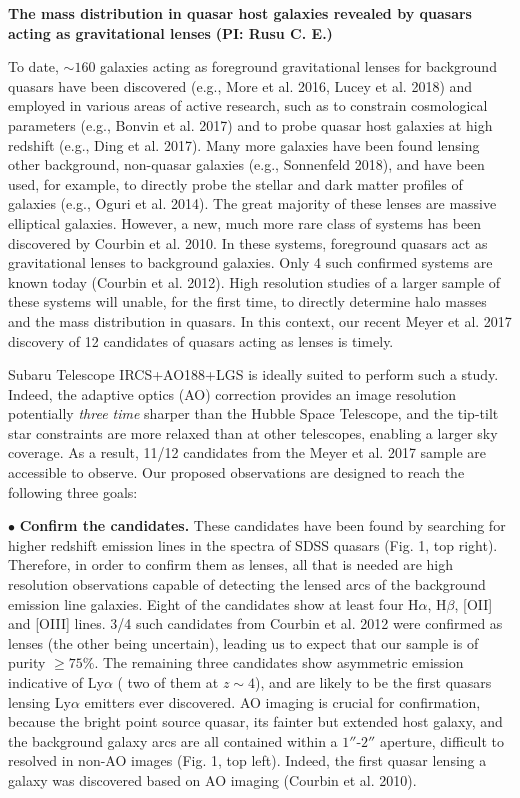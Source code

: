 \documentclass[a4paper,11pt]{article}
\begin{document}
\begin {centering}
{\bf The mass distribution in quasar host galaxies revealed by quasars acting as gravitational lenses} {\bf (PI: Rusu C. E.)}\\
 \end{centering}
 
\medskip

To date, $\sim160$ galaxies acting as foreground gravitational lenses for background quasars have been discovered (e.g., More et al. 2016, Lucey et al. 2018) and employed in various areas of active research, such as to constrain cosmological parameters (e.g., Bonvin et al. 2017) and to probe quasar host galaxies at high redshift (e.g., Ding et al. 2017). Many more galaxies have been found lensing other background, non-quasar galaxies (e.g., Sonnenfeld 2018), and have been used, for example, to directly probe the stellar and dark matter profiles of galaxies (e.g., Oguri et al. 2014). The great majority of these lenses are massive elliptical galaxies. However, a new, much more rare class of systems has been discovered by Courbin et al. 2010. In these systems, foreground quasars act as gravitational lenses to background galaxies. Only 4 such confirmed systems are known today (Courbin et al. 2012). High resolution studies of a larger sample of these systems will unable, for the first time, to directly determine halo masses and the mass distribution in quasars. In this context, our recent Meyer et al. 2017 discovery  of 12 candidates of quasars acting as lenses is timely. 

Subaru Telescope IRCS+AO188+LGS is ideally suited to perform such a study. Indeed, the adaptive optics (AO) correction provides an image resolution potentially {\it three time} sharper than the Hubble Space Telescope, and the tip-tilt star constraints are more relaxed than at other telescopes, enabling a larger sky coverage. As a result, 11/12 candidates from the Meyer et al. 2017 sample are accessible to observe. Our proposed observations are designed to reach the following three goals:

$\bullet$ {\bf Confirm the candidates.} These candidates have been found by searching for higher redshift emission lines in the spectra of SDSS quasars (Fig. 1, top right). Therefore, in order to confirm them as lenses, all that is needed are high resolution observations capable of detecting the lensed arcs of the background emission line galaxies. Eight of the candidates show at least four H$\alpha$, H$\beta$, [OII] and [OIII] lines. 3/4 such candidates from Courbin et al. 2012 were confirmed as lenses (the other being uncertain), leading us to expect that our sample is of purity $\geq75\%$. The remaining three candidates show asymmetric emission indicative of Ly$\alpha$ ( two of them at $z\sim4$), and are likely to be the first quasars lensing Ly$\alpha$ emitters ever discovered. AO imaging is crucial for confirmation, because the bright point source quasar, its fainter but extended host galaxy, and the background galaxy arcs are all contained within a $1''$-$2''$ aperture, difficult to resolved in non-AO images (Fig. 1, top left). Indeed, the first quasar lensing a galaxy was discovered based on AO imaging (Courbin et al. 2010).
\end{document}
